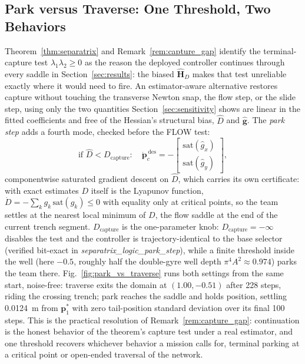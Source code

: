 \documentclass[lettersize,journal]{IEEEtran}
\begin{document}
\subsection{Park versus Traverse: One Threshold, Two Behaviors}
\label{sec:park_vs_traverse}

Theorem~\ref{thm:separatrix} and Remark~\ref{rem:capture_gap} identify
the terminal-capture test $\lambda_1\lambda_2 \geq 0$ as the reason the
deployed controller continues through every saddle in
Section~\ref{sec:results}: the biased $\hat{\mathbf{H}}_D$ makes that
test unreliable exactly where it would need to fire. An estimator-aware
alternative restores capture without touching the transverse Newton
snap, the flow step, or the slide step, using only the two quantities
Section~\ref{sec:sensitivity} shows are linear in the fitted
coefficients and free of the Hessian's structural bias, $\hat{D}$ and
$\hat{\mathbf{g}}$. The \emph{park step} adds a fourth mode, checked
before the FLOW test:
\begin{equation}
    \text{if } \hat{D} < D_{\text{capture}}:\quad
    \dot{\mathbf{p}}_c^{\,\text{des}} =
    -\begin{bmatrix}
        \mathrm{sat}(\hat{g}_x) \\ \mathrm{sat}(\hat{g}_y)
    \end{bmatrix},
    \label{eq:park_step}
\end{equation}
componentwise saturated gradient descent on $\hat{D}$, which carries
its own certificate: with exact estimates $D$ itself is the Lyapunov
function, $\dot{D} = -\sum_k g_k\,\mathrm{sat}(g_k) \leq 0$ with
equality only at critical points, so the team settles at the nearest
local minimum of $D$, the flow saddle at the end of the
current trench segment. $D_{\text{capture}}$ is the one-parameter
knob: $D_{\text{capture}} = -\infty$ disables the test and the
controller is trajectory-identical to the base selector (verified
bit-exact in \textit{separatrix\_logic\_park\_step}), while a finite
threshold inside the well (here $-0.5$, roughly half the double-gyre
well depth $\pi^4 A^2 \approx 0.974$) parks the team there.
Fig.~\ref{fig:park_vs_traverse} runs both settings from the same start,
noise-free: traverse exits the domain at $(1.00, -0.51)$ after 228
steps, riding the crossing trench; park reaches the saddle and holds
position, settling 0.0124~m from $\mathbf{p}^*_1$ with zero
tail-position standard deviation over its final 100 steps. This is the
practical resolution of Remark~\ref{rem:capture_gap}: continuation is
the honest behavior of the theorem's capture test under a real
estimator, and one threshold recovers whichever behavior a mission
calls for, terminal parking at a critical point or open-ended traversal
of the network.
\end{document}
